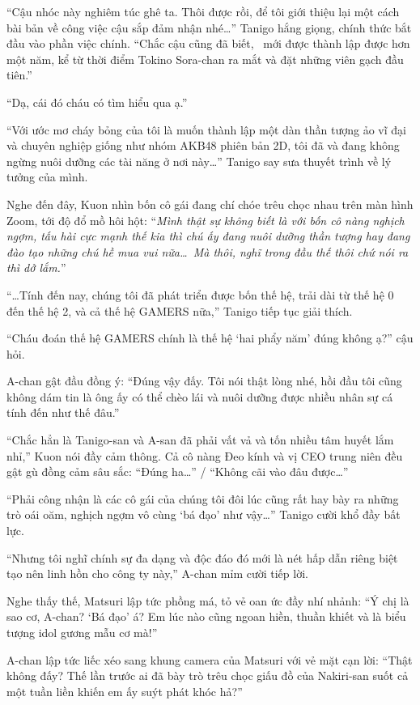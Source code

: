 \documentclass[../main.tex]{subfiles}
\begin{document}
``Cậu nhóc này nghiêm túc ghê ta. Thôi được rồi, để tôi giới thiệu lại một cách bài bản về công việc cậu sắp đảm nhận nhé\dots'' Tanigo hắng giọng, chính thức bắt đầu vào phần việc chính. ``Chắc cậu cũng đã biết, \hll\ mới được thành lập được hơn một năm, kể từ thời điểm Tokino Sora-chan ra mắt và đặt những viên gạch đầu tiên.''

``Dạ, cái đó cháu có tìm hiểu qua ạ.''

``Với ước mơ cháy bỏng của tôi là muốn thành lập một dàn thần tượng ảo vĩ đại và chuyên nghiệp giống như nhóm AKB48 phiên bản 2D, tôi đã và đang không ngừng nuôi dưỡng các tài năng ở nơi này\dots'' Tanigo say sưa thuyết trình về lý tưởng của mình.

Nghe đến đây, Kuon nhìn bốn cô gái đang chí chóe trêu chọc nhau trên màn hình Zoom, tới độ đổ mồ hôi hột: ``\textit{Mình thật sự không biết là với bốn cô nàng nghịch ngợm, tấu hài cực mạnh thế kia thì chú ấy đang nuôi dưỡng thần tượng hay đang đào tạo những chú hề mua vui nữa\dots\ Mà thôi, nghĩ trong đầu thế thôi chứ nói ra thì dở lắm.}''

``\dots Tính đến nay, chúng tôi đã phát triển được bốn thế hệ, trải dài từ thế hệ 0 đến thế hệ 2, và cả thế hệ GAMERS nữa,'' Tanigo tiếp tục giải thích.

``Cháu đoán thế hệ GAMERS chính là thế hệ `hai phẩy năm' đúng không ạ?'' cậu hỏi.

A-chan gật đầu đồng ý: ``Đúng vậy đấy. Tôi nói thật lòng nhé, hồi đầu tôi cũng không dám tin là ông ấy có thể chèo lái và nuôi dưỡng được nhiều nhân sự cá tính đến như thế đâu.''

``Chắc hẳn là Tanigo-san và A-san đã phải vất vả và tốn nhiều tâm huyết lắm nhỉ,'' Kuon nói đầy cảm thông. Cả cô nàng Đeo kính và vị CEO trung niên đều gật gù đồng cảm sâu sắc: ``Đúng ha\dots'' / ``Không cãi vào đâu được\dots''

``Phải công nhận là các cô gái của chúng tôi đôi lúc cũng rất hay bày ra những trò oái oăm, nghịch ngợm vô cùng `bá đạo' như vậy\dots'' Tanigo cười khổ đầy bất lực.

``Nhưng tôi nghĩ chính sự đa dạng và độc đáo đó mới là nét hấp dẫn riêng biệt tạo nên linh hồn cho công ty này,'' A-chan mỉm cười tiếp lời.

Nghe thấy thế, Matsuri lập tức phồng má, tỏ vẻ oan ức đầy nhí nhảnh: ``Ý chị là sao cơ, A-chan? `Bá đạo' á? Em lúc nào cũng ngoan hiền, thuần khiết và là biểu tượng idol gương mẫu cơ mà!''

A-chan lập tức liếc xéo sang khung camera của Matsuri với vẻ mặt cạn lời: ``Thật không đấy? Thế lần trước ai đã bày trò trêu chọc giấu đồ của Nakiri-san suốt cả một tuần liền khiến em ấy suýt phát khóc hả?''
\end{document}

